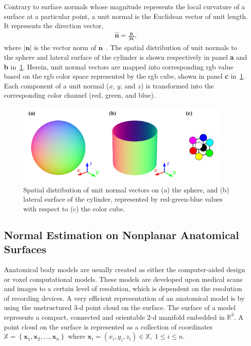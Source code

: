Contrary to surface normals whose magnitude represents the local curvature of a surface at a particular point, a unit normal is the Euclidean vector of unit length.
It represents the direction vector,
\begin{align}
    \mathbf{\hat n} = \frac{\mathbf{n}}{\left| \mathbf{n} \right|},
\end{align}
where $\left| \mathbf{n} \right|$ is the vector norm of $\mathbf{n}$~\cite{Weisstein2023Unit}.
The spatial distribution of unit normals to the sphere and lateral surface of the cylinder is shown respectively in panel \textbf{a} and \textbf{b} in~\cref{fig:normals}.
Herein, unit normal vectors are mapped into corresponding \gls{rgb} value based on the \gls{rgb} color space represented by the \gls{rgb} cube, shown in panel \textbf{c} in~\cref{fig:normals}.
Each component of a unit normal ($x$, $y$, and $z$) is transformed into the corresponding color channel (red, green, and blue).
\begin{figure}[t]
    \centering
    \includegraphics[width=0.96\textwidth]{artwork/normals.pdf}
    \caption{Spatial distribution of unit normal vectors on (a) the sphere, and (b) lateral surface of the cylinder, represented by red-green-blue values with respect to (c) the color cube.}
    \label{fig:normals}
\end{figure}

\subsection{Normal Estimation on Nonplanar Anatomical Surfaces}
Anatomical body models are usually created as either the computer-aided design or voxel computational models.
These models are developed upon medical scans and images to a certain level of resolution, which is dependent on the resolution of recording devices.
A very efficient representation of an anatomical model is by using the unstructured \gls{3-d} point cloud on the surface.
The surface of a model represents a compact, connected and orientable \gls{2-d} manifold embedded in $\mathbb{R}^3$.
A point cloud on the surface is represented as a collection of coordinates $\mathbb{X} = \left\{ \mathbf{x}_1, \mathbf{x}_2, \dots, \mathbf{x}_n \right\}$ where $\mathbf{x}_i = (x_i, y_i, z_i) \in \mathbb{X}, \; 1 \leq i \leq n$.


